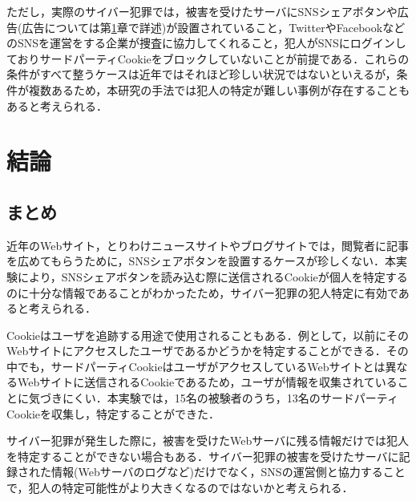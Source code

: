 \documentclass[10pt, a4paper]{jreport}
\begin{document}
ただし，実際のサイバー犯罪では，被害を受けたサーバにSNSシェアボタンや広告(広告については第\ref{sec: conclusion}章で詳述)が設置されていること，TwitterやFacebookなどのSNSを運営をする企業が捜査に協力してくれること，犯人がSNSにログインしておりサードパーティCookieをブロックしていないことが前提である．これらの条件がすべて整うケースは近年ではそれほど珍しい状況ではないといえるが，条件が複数あるため，本研究の手法では犯人の特定が難しい事例が存在することもあると考えられる．


























\chapter{結論}\label{sec: conclusion}
\section{まとめ}
近年のWebサイト，とりわけニュースサイトやブログサイトでは，閲覧者に記事を広めてもらうために，SNSシェアボタンを設置するケースが珍しくない．本実験により，SNSシェアボタンを読み込む際に送信されるCookieが個人を特定するのに十分な情報であることがわかったため，サイバー犯罪の犯人特定に有効であると考えられる．

Cookieはユーザを追跡する用途で使用されることもある．例として，以前にそのWebサイトにアクセスしたユーザであるかどうかを特定することができる．その中でも，サードパーティCookieはユーザがアクセスしているWebサイトとは異なるWebサイトに送信されるCookieであるため，ユーザが情報を収集されていることに気づきにくい．本実験では，15名の被験者のうち，13名のサードパーティCookieを収集し，特定することができた．

サイバー犯罪が発生した際に，被害を受けたWebサーバに残る情報だけでは犯人を特定することができない場合もある．サイバー犯罪の被害を受けたサーバに記録された情報(Webサーバのログなど)だけでなく，SNSの運営側と協力することで，犯人の特定可能性がより大きくなるのではないかと考えられる．
\end{document}
